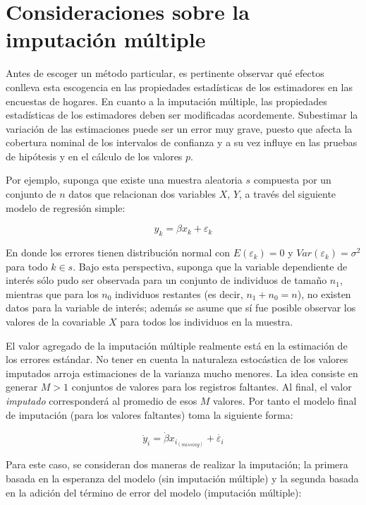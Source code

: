 \documentclass[
  12pt,
  spanish,
]{book}
\begin{document}
\hypertarget{consideraciones-sobre-la-imputaciuxf3n-muxfaltiple}{%
\section{Consideraciones sobre la imputación múltiple}\label{consideraciones-sobre-la-imputaciuxf3n-muxfaltiple}}

Antes de escoger un método particular, es pertinente observar qué efectos conlleva esta escogencia en las propiedades estadísticas de los estimadores en las encuestas de hogares. En cuanto a la imputación múltiple, las propiedades estadísticas de los estimadores deben ser modificadas acordemente. Subestimar la variación de las estimaciones puede ser un error muy grave, puesto que afecta la cobertura nominal de los intervalos de confianza y a su vez influye en las pruebas de hipótesis y en el cálculo de los valores \(p\).

Por ejemplo, suponga que existe una muestra aleatoria \(s\) compuesta por un conjunto de \(n\) datos que relacionan dos variables \(X\), \(Y\), a través del siguiente modelo de regresión simple:

\[
y_k = \beta x_k + \varepsilon_k
\]

En donde los errores tienen distribución normal con \(E(\varepsilon_k) = 0\) y \(Var(\varepsilon_k) = \sigma ^2\) para todo \(k\in s\). Bajo esta perspectiva, suponga que la variable dependiente de interés sólo pudo ser observada para un conjunto de individuos de tamaño \(n_1\), mientras que para los \(n_0\) individuos restantes (es decir, \(n_1 + n_0 = n\)), no existen datos para la variable de interés; además se asume que sí fue posible observar los valores de la covariable \(X\) para todos los individuos en la muestra.

El valor agregado de la imputación múltiple \citep{Rubin_1987} realmente está en la estimación de los errores estándar. No tener en cuenta la naturaleza estocástica de los valores imputados arroja estimaciones de la varianza mucho menores. La idea consiste en generar \(M > 1\) conjuntos de valores para los registros faltantes. Al final, el valor \emph{imputado} corresponderá al promedio de esos \(M\) valores. Por tanto el modelo final de imputación (para los valores faltantes) toma la siguiente forma:

\[\dot{y}_i = \dot{\beta} x_{i_{(missing)}}+ \dot{\varepsilon_i}\]

Para este caso, se consideran dos maneras de realizar la imputación; la primera basada en la esperanza del modelo (sin imputación múltiple) y la segunda basada en la adición del término de error del modelo (imputación múltiple):
\end{document}
